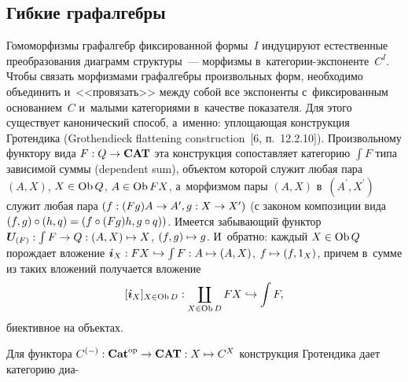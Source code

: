 \begin{multicols}{2}
\vspace*{-4pt}

\section{Гибкие графалгебры}

\vspace*{-1pt}

     Гомоморфизмы графалгебр фиксированной формы~$I$ индуцируют 
естественные преобразования диаграмм структуры~--- морфизмы  
в~ка\-те\-го\-рии-экс\-по\-нен\-те~$C^I$. Чтобы связать морфизмами 
графалгебры произвольных форм, необходимо объединить и~<<провязать>> 
меж\-ду собой все экспоненты с~фиксированным основанием~$C$ и~малыми 
категориями в~качестве показателя. Для этого существует канонический способ, 
а~именно: уплощающая конструкция Гротендика (Grothendieck flattening 
construction~[6, п.~12.2.10]). Произвольному функтору вида $F : Q \hm\to 
\mathbf{CAT}$ эта конструкция со\-по\-став\-ля\-ет категорию $\int F$ типа 
зависимой суммы (dependent sum), объектом которой служит любая пара $(A, 
X)$, $X \hm\in \mathrm{Ob}\,Q$, $A \hm\in \mathrm{Ob}\,FX$, а~морфизмом 
пары $(A, X)$ в~$(A^\prime, X^\prime)$ служит любая пара $(f : (Fg)A \hm\to  
A^\prime, g : X \hm\to  X^\prime)$ (с законом композиции вида $(f, g) \circ (h, q) 
\hm= (f \circ (Fg)h, g \circ q))$. Имеется забывающий функтор $\bm{U}_{(F)} : \int 
F \hm\to  Q : (A, X) \hm\mapsto X$, $(f, g) \hm\mapsto g$. И~обратно: каждый 
$X\hm\in \mathrm{Ob}\,Q$ по\-рож\-да\-ет вложение $\bm{i}_X : FX \hm\hookrightarrow  
\int F : A \mapsto (A, X)$, $f \hm\mapsto (f, 1_X)$, причем в~сумме из таких 
вложений получается вложение  
$$
[\bm{i}_X]_{X \in\mathrm{Ob}\,D} : \coprod\limits_{X\in\mathrm{Ob}\,D} FX 
\hm\hookrightarrow  \int F,
$$ биективное на объектах.
     
     Для функтора $C^{(-)} : \mathbf{Cat}^{\mathrm{op}} \hm\to \mathbf{CAT} : X \hm\mapsto 
C^X$ конструкция Гротендика дает категорию диа-\linebreak\vspace*{-12pt}

\pagebreak


\end{multicols}
